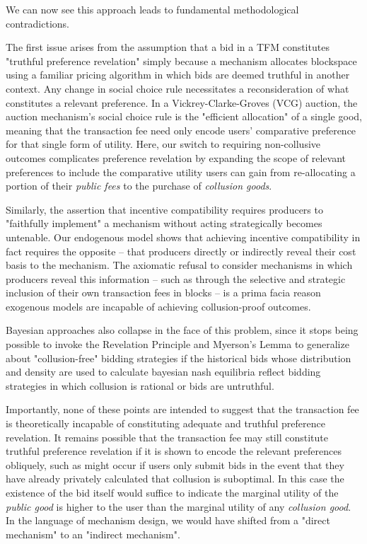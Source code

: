 \documentclass[oneside]{article}   	%
\begin{document}
We can now see this approach leads to fundamental methodological contradictions.

The first issue arises from the assumption that a bid in a TFM constitutes "truthful preference revelation" simply because a mechanism allocates blockspace using a familiar pricing algorithm in which bids are deemed truthful in another context. Any change in social choice rule necessitates a reconsideration of what constitutes a relevant preference. In a Vickrey-Clarke-Groves (VCG) auction, the auction mechanism's social choice rule is the "efficient allocation" of a single good, meaning that the transaction fee need only encode users' comparative preference for that single form of utility. Here, our switch to requiring non-collusive outcomes complicates preference revelation by expanding the scope of relevant preferences to include the comparative utility users can gain from re-allocating a portion of their \textit{public fees} to the purchase of \textit{collusion goods}.

Similarly, the assertion that incentive compatibility requires producers to "faithfully implement" a mechanism without acting strategically becomes untenable. Our endogenous model shows that achieving incentive compatibility in fact requires the opposite -- that producers directly or indirectly reveal their cost basis to the mechanism. The axiomatic refusal to consider mechanisms in which producers reveal this information -- such as through the selective and strategic inclusion of their own transaction fees in blocks -- is a prima facia reason exogenous models are incapable of achieving collusion-proof outcomes.

Bayesian approaches also collapse in the face of this problem, since it stops being possible to invoke the Revelation Principle and Myerson's Lemma to generalize about "collusion-free" bidding strategies if the historical bids whose distribution and density are used to calculate bayesian nash equilibria reflect bidding strategies in which collusion is rational or bids are untruthful.

Importantly, none of these points are intended to suggest that the transaction fee is theoretically incapable of constituting adequate and truthful preference revelation. It remains possible that the transaction fee may still constitute truthful preference revelation if it is shown to encode the relevant preferences obliquely, such as might occur if users only submit bids in the event that they have already privately calculated that collusion is suboptimal. In this case the existence of the bid itself would suffice to indicate the marginal utility of the \textit{public good} is higher to the user than the marginal utility of any \textit{collusion good}. In the language of mechanism design, we would have shifted from a "direct mechanism" to an "indirect mechanism".
\end{document}
